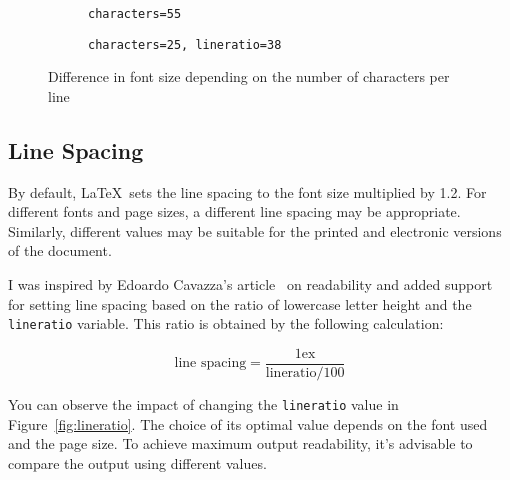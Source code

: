 \documentclass{ltugboat}
\begin{document}
\begin{figure}[tbp]
  \begin{subfigure}[t]{0.45\textwidth}
\caption{\texttt{characters=55}}
\end{subfigure}
\hfill
\begin{subfigure}[t]{0.45\textwidth}
\caption{\texttt{characters=25, lineratio=38}}
\end{subfigure}
  \caption{Difference in font size depending on the number of characters per line}\label{fig:fontsize}
\end{figure}

\subsection{Line Spacing}

By default, \LaTeX\ sets the line spacing to the font size multiplied by 1.2.
For different fonts and page sizes, a different line spacing may be
appropriate. Similarly, different values may be suitable for the printed and
electronic versions of the document.

I was inspired by Edoardo Cavazza's article~\cite{cavazza} on readability and
added support for setting line spacing based on the ratio of lowercase letter
height and the \texttt{lineratio} variable. This ratio is obtained by the
following calculation:

\[ \text{line spacing} = \frac{1\text{ex}}{\text{lineratio}/100} \]

You can observe the impact of changing the \texttt{lineratio} value in
Figure~\ref{fig:lineratio}. The choice of its optimal value depends on the font
used and the page size. To achieve maximum output readability, it's advisable
to compare the output using different values.
\end{document}
